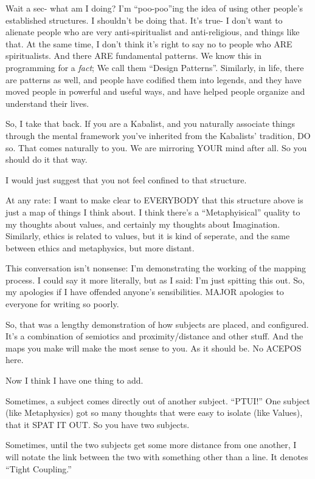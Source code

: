 \documentclass[oneside]{book}
\begin{document}
Wait a sec- what am I doing? I'm ``poo-poo''ing the idea of using other
people's established structures. I shouldn't be doing that. It's true-
I don't want to alienate people who are very anti-spiritualist and
anti-religious, and things like that. At the same time, I don't think
it's right to say no to people who ARE spiritualists. And there ARE
fundamental patterns. We know this in programming for a \emph{fact}; We
call them ``Design Patterns''. Similarly, in life, there are patterns as
well, and people have codified them into legends, and they have moved
people in powerful and useful ways, and have helped people organize
and understand their lives.

So, I take that back. If you are a Kabalist, and you naturally
associate things through the mental framework you've inherited from
the Kabalists' tradition, DO so. That comes naturally to you. We are
mirroring YOUR mind after all. So you should do it that way.

I would just suggest that you not feel confined to that structure.

At any rate: I want to make clear to EVERYBODY that this structure
above is just a map of things I think about. I think there's a
``Metaphyisical'' quality to my thoughts about values, and certainly my
thoughts about Imagination. Similarly, ethics is related to values,
but it is kind of seperate, and the same between ethics and
metaphysics, but more distant.

This conversation isn't nonsense: I'm demonstrating the working of the
mapping process. I could say it more literally, but as I said: I'm
just spitting this out. So, my apologies if I have offended anyone's
sensibilities. MAJOR apologies to everyone for writing so poorly.

So, that was a lengthy demonstration of how subjects are placed, and
configured. It's a combination of semiotics and proximity/distance and
other stuff. And the maps you make will make the most sense to you. As
it should be. No ACEPOS here.

Now I think I have one thing to add.

Sometimes, a subject comes directly out of another subject. ``PTUI!''
One subject (like Metaphysics) got so many thoughts that were easy to
isolate (like Values), that it SPAT IT OUT. So you have two subjects.

Sometimes, until the two subjects get some more distance from one
another, I will notate the link between the two with something other
than a line. It denotes ``Tight Coupling.''
\end{document}

